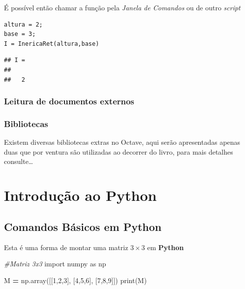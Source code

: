 \documentclass[
]{book}
\newenvironment{Shaded}{\begin{snugshade}}{\end{snugshade}}
\newcommand{\BuiltInTok}[1]{#1}
\newcommand{\CommentTok}[1]{\textcolor[rgb]{0.56,0.35,0.01}{\textit{#1}}}
\newcommand{\DecValTok}[1]{\textcolor[rgb]{0.00,0.00,0.81}{#1}}
\newcommand{\ImportTok}[1]{#1}
\newcommand{\NormalTok}[1]{#1}
\newcommand{\OperatorTok}[1]{\textcolor[rgb]{0.81,0.36,0.00}{\textbf{#1}}}
\begin{document}
É possível então chamar a função pela \emph{Janela de Comandos} ou de outro \emph{script}

\begin{verbatim}
altura = 2;
base = 3;
I = InericaRet(altura,base)
\end{verbatim}

\begin{verbatim}
## I = 
##
##   2
\end{verbatim}

\hypertarget{leitura-de-documentos-externos}{%
\subsection{Leitura de documentos externos}\label{leitura-de-documentos-externos}}

\hypertarget{bibliotecas}{%
\subsection{Bibliotecas}\label{bibliotecas}}

Existem diversas bibliotecas extras no Octave, aqui serão apresentadas apenas duas que por ventura são utilizadas ao decorrer do livro, para mais detalhes consulte\ldots{}

\hypertarget{cross}{%
\chapter{Introdução ao Python}\label{cross}}

\hypertarget{comandos-buxe1sicos-em-python}{%
\section{Comandos Básicos em Python}\label{comandos-buxe1sicos-em-python}}

Esta é uma forma de montar uma matriz \(3 \times 3\) em \textbf{Python}

\begin{Shaded}
\begin{Highlighting}[]
\CommentTok{\#Matriz 3x3}
\ImportTok{import}\NormalTok{ numpy }\ImportTok{as}\NormalTok{ np}

\NormalTok{M }\OperatorTok{=}\NormalTok{ np.array([[}\DecValTok{1}\NormalTok{,}\DecValTok{2}\NormalTok{,}\DecValTok{3}\NormalTok{],}
\NormalTok{              [}\DecValTok{4}\NormalTok{,}\DecValTok{5}\NormalTok{,}\DecValTok{6}\NormalTok{],}
\NormalTok{              [}\DecValTok{7}\NormalTok{,}\DecValTok{8}\NormalTok{,}\DecValTok{9}\NormalTok{]])}
\BuiltInTok{print}\NormalTok{(M)}
\end{Highlighting}
\end{Shaded}
\end{document}

